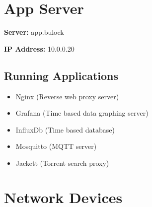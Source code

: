 \documentclass[]{article}
\providecommand{\tightlist}{%
  \setlength{\itemsep}{0pt}\setlength{\parskip}{0pt}}
\begin{document}

\newpage

\vspace{\baselineskip}\section*{App Server}

\textbf{Server: }
{app.bulock}

\textbf{IP Address: }
{10.0.0.20}

\subsection{\texorpdfstring{{Running Applications}}{Running Applications}}

\begin{itemize}
\tightlist
\item
  {Nginx (Reverse web proxy server)}
\item
  {Grafana (Time based data graphing server)}
\item
  {InfluxDb (Time based database)}
\item
  {Mosquitto (MQTT server)}
\item
  {Jackett (Torrent search proxy)}
\end{itemize}



\newpage

\vspace{\baselineskip}\section*{Network Devices}
\end{document}
